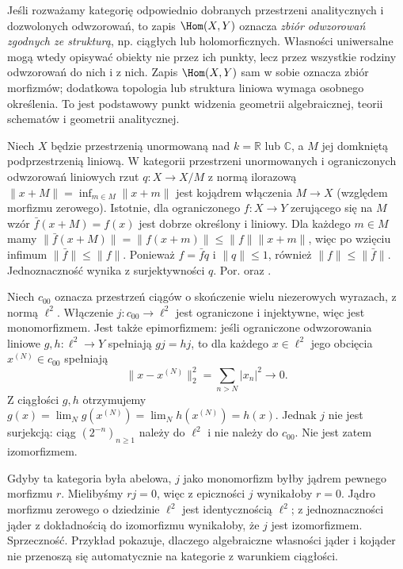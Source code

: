 Jeśli rozważamy kategorię odpowiednio dobranych przestrzeni analitycznych i dozwolonych odwzorowań, to zapis $\Hom(X,Y)$ oznacza \emph{zbiór odwzorowań zgodnych ze strukturą}, np. ciągłych lub holomorficznych. Własności uniwersalne mogą wtedy opisywać obiekty nie przez ich punkty, lecz przez wszystkie rodziny odwzorowań do nich i z nich. Zapis $\Hom(X,Y)$ sam w sobie oznacza zbiór morfizmów; dodatkowa topologia lub struktura liniowa wymaga osobnego określenia. To jest podstawowy punkt widzenia geometrii algebraicznej, teorii schematów i geometrii analitycznej.

\begin{przyklad}\label{cat:ex:normed-quotient}
Niech $X$ będzie przestrzenią unormowaną nad $k=\mathbb R$ lub $\mathbb C$, a $M$ jej domkniętą podprzestrzenią liniową. W kategorii przestrzeni unormowanych i ograniczonych odwzorowań liniowych rzut $q:X\to X/M$ z normą ilorazową $\|x+M\|=\inf_{m\in M}\|x+m\|$ jest kojądrem włączenia $M\to X$ (względem morfizmu zerowego). Istotnie, dla ograniczonego $f:X\to Y$ zerującego się na $M$ wzór $\bar f(x+M)=f(x)$ jest dobrze określony i liniowy. Dla każdego $m\in M$ mamy $\|\bar f(x+M)\|=\|f(x+m)\|\leq\|f\|\|x+m\|$, więc po wzięciu infimum $\|\bar f\|\leq\|f\|$. Ponieważ $f=\bar f q$ i $\|q\|\leq1$, również $\|f\|\leq\|\bar f\|$. Jednoznaczność wynika z surjektywności $q$. Por.  oraz .
\end{przyklad}

\begin{przyklad}\label{cat:ex:normed-nonabelian}
Niech $c_{00}$ oznacza przestrzeń ciągów o skończenie wielu niezerowych wyrazach, z normą $\ell^2$. Włączenie $j:c_{00}\to\ell^2$ jest ograniczone i injektywne, więc jest monomorfizmem. Jest także epimorfizmem: jeśli ograniczone odwzorowania liniowe $g,h:\ell^2\to Y$ spełniają $gj=hj$, to dla każdego $x\in\ell^2$ jego obcięcia $x^{(N)}\in c_{00}$ spełniają
\[
\|x-x^{(N)}\|_2^2=\sum_{n>N}|x_n|^2\longrightarrow0.
\]
Z ciągłości $g,h$ otrzymujemy $g(x)=\lim_N g(x^{(N)})=\lim_N h(x^{(N)})=h(x)$. Jednak $j$ nie jest surjekcją: ciąg $(2^{-n})_{n\geq1}$ należy do $\ell^2$ i nie należy do $c_{00}$. Nie jest zatem izomorfizmem.

Gdyby ta kategoria była abelowa, $j$ jako monomorfizm byłby jądrem pewnego morfizmu $r$. Mielibyśmy $rj=0$, więc z epiczności $j$ wynikałoby $r=0$. Jądro morfizmu zerowego o dziedzinie $\ell^2$ jest identycznością $\ell^2$; z jednoznaczności jąder z dokładnością do izomorfizmu wynikałoby, że $j$ jest izomorfizmem. Sprzeczność. Przykład pokazuje, dlaczego algebraiczne własności jąder i kojąder nie przenoszą się automatycznie na kategorie z warunkiem ciągłości.
\end{przyklad}

